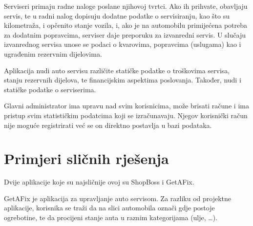 		Serviseri primaju radne naloge poslane njihovoj tvrtci. Ako ih prihvate, obavljaju servis, te u radni nalog dopisuju dodatne podatke o servisiranju, kao što su kilometraža, i opčenito stanje vozila, i, ako je na automobilu primijećena potreba za dodatnim popravcima, serviser daje preporuku za izvanredni servis. U slučaju izvanrednog servisa unose se podaci o kvarovima, popravcima (uslugama) kao i ugrađenim rezervnim dijelovima.

		Aplikacija nudi auto servisu različite statičke podatke o troškovima servisa, stanju rezervnih dijelova, te financijskim aspektima poslovanja. Također, nudi i statičke podatke o serviserima.
		
		Glavni administrator ima upravu nad svim korisnicima, može brisati račune i ima pristup svim statističkim podatcima koji se izračunavaju. Njegov korisnički račun nije moguće registrirati već se on direktno postavlja u bazi podataka.
		
		\section{Primjeri sličnih rješenja}
		
		\normalsize Dvije aplikacije koje su najsličnije ovoj su ShopBoss i GetAFix. 
		
		GetAFix je aplikacija za upravljanje auto servisom. Za razliku od projektne aplikacije, korisnika se traži da na slici automobila označi gdje postoje ogrebotine, te da procijeni stanje auta u raznim kategorijama (ulje, \ldots).
		
